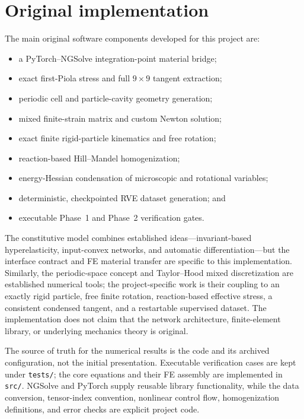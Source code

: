 \section{Original implementation}

The main original software components developed for this project are:
\begin{itemize}
  \item a PyTorch--NGSolve integration-point material bridge;
  \item exact first-Piola stress and full \(9\times9\) tangent extraction;
  \item periodic cell and particle-cavity geometry generation;
  \item mixed finite-strain matrix and custom Newton solution;
  \item exact finite rigid-particle kinematics and free rotation;
  \item reaction-based Hill--Mandel homogenization;
  \item energy-Hessian condensation of microscopic and rotational variables;
  \item deterministic, checkpointed RVE dataset generation; and
  \item executable Phase~1 and Phase~2 verification gates.
\end{itemize}

The constitutive model combines established ideas---invariant-based
hyperelasticity, input-convex networks, and automatic differentiation---but
the interface contract and FE material transfer are specific to this
implementation. Similarly, the periodic-space concept and Taylor--Hood
mixed discretization are established numerical tools; the project-specific
work is their coupling to an exactly rigid particle, free finite rotation,
reaction-based effective stress, a consistent condensed tangent, and a
restartable supervised dataset. The implementation does not claim that the
network architecture, finite-element library, or underlying mechanics
theory is original.

The source of truth for the numerical results is the code and its archived
configuration, not the initial presentation. Executable verification cases
are kept under \texttt{tests/}; the core equations and their FE assembly are
implemented in \texttt{src/}. NGSolve and PyTorch supply reusable library
functionality, while the data conversion, tensor-index convention, nonlinear
control flow, homogenization definitions, and error checks are explicit
project code.

